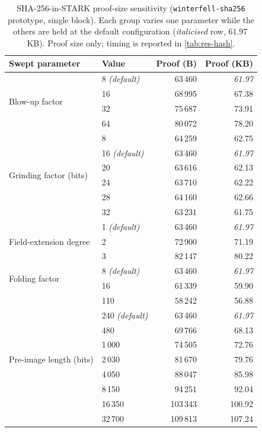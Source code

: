 \documentclass{article}
\begin{document}
\begin{table}[ht]
  \centering
  \caption{SHA-256-in-STARK proof-size sensitivity (\texttt{winterfell-sha256}
  prototype, single block). Each group varies one parameter while the others are
  held at the default configuration (\emph{italicised} row, $61.97$\,KB). Proof
  size only; timing is reported in \cref{tab:res-hash}.}
  \label{tab:res-stark-sweep}
  \small
  \begin{tabular}{@{}llrr@{}}
    \toprule
    \textbf{Swept parameter} & \textbf{Value} & \textbf{Proof (B)} & \textbf{Proof (KB)} \\
    \midrule
    \multirow{4}{*}{Blow-up factor}
        & 8 \emph{(default)} & 63\,460 & \emph{61.97} \\
        & 16                 & 68\,995 & 67.38 \\
        & 32                 & 75\,687 & 73.91 \\
        & 64                 & 80\,072 & 78.20 \\
    \midrule
    \multirow{6}{*}{Grinding factor (bits)}
        & 8                  & 64\,259 & 62.75 \\
        & 16 \emph{(default)}& 63\,460 & \emph{61.97} \\
        & 20                 & 63\,616 & 62.13 \\
        & 24                 & 63\,710 & 62.22 \\
        & 28                 & 64\,160 & 62.66 \\
        & 32                 & 63\,231 & 61.75 \\
    \midrule
    \multirow{3}{*}{Field-extension degree}
        & 1 \emph{(default)} & 63\,460 & \emph{61.97} \\
        & 2                  & 72\,900 & 71.19 \\
        & 3                  & 82\,147 & 80.22 \\
    \midrule
    \multirow{2}{*}{Folding factor}
        & 8 \emph{(default)} & 63\,460 & \emph{61.97} \\
        & 16                 & 61\,339 & 59.90 \\
    \midrule
    \multirow{9}{*}{Pre-image length (bits)}
        & 110                & 58\,242 & 56.88 \\
        & 240 \emph{(default)}& 63\,460& \emph{61.97} \\
        & 480                & 69\,766 & 68.13 \\
        & 1\,000             & 74\,505 & 72.76 \\
        & 2\,030             & 81\,670 & 79.76 \\
        & 4\,050             & 88\,047 & 85.98 \\
        & 8\,150             & 94\,251 & 92.04 \\
        & 16\,350            & 103\,343& 100.92 \\
        & 32\,700            & 109\,813& 107.24 \\
    \bottomrule
  \end{tabular}
\end{table}
\end{document}
